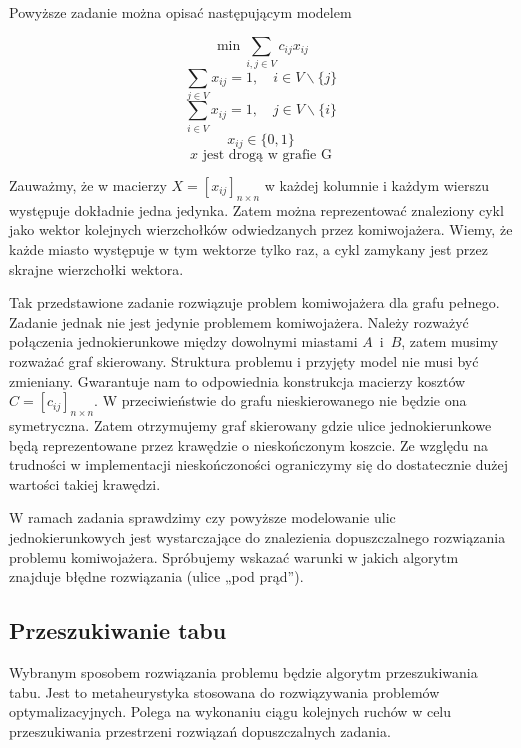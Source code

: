 \documentclass[11pt,a4paper,twoside]{article}
\begin{document}
Powyższe zadanie można opisać następującym modelem

\begin{equation}
\min \sum_{i,j \in V} c_{ij} x_{ij} 
\label{f_celu}
\end{equation}
\begin{equation}
\sum_{j \in V} x_{ij}=1, \quad i \in V \backslash \{j\} 
\end{equation}
\begin{equation}
\sum_{i \in V} x_{ij}=1, \quad j \in V \backslash \{i\} 
\end{equation}
\begin{equation}
x_{ij} \in \{0,1\}
\end{equation}
\begin{equation}
x \text{ jest drogą w grafie G}
\end{equation}


Zauważmy, że w macierzy $X = [x_{ij}]_{n\times n}$ w każdej kolumnie i każdym wierszu występuje dokładnie jedna jedynka. Zatem można reprezentować znaleziony cykl jako wektor kolejnych wierzchołków odwiedzanych przez komiwojażera. Wiemy, że każde miasto występuje w tym wektorze tylko raz, a cykl zamykany jest przez skrajne wierzchołki wektora.

Tak przedstawione zadanie rozwiązuje problem komiwojażera dla grafu pełnego. Zadanie jednak nie jest jedynie problemem komiwojażera. Należy rozważyć połączenia jednokierunkowe między dowolnymi miastami \mbox{$A$ i $B$}, zatem musimy rozważać graf skierowany. Struktura problemu i przyjęty model nie musi być zmieniany. Gwarantuje nam to odpowiednia konstrukcja macierzy kosztów $C = [c_{ij}]_{n\times n}$. W przeciwieństwie do grafu nieskierowanego nie będzie ona symetryczna. Zatem otrzymujemy graf skierowany gdzie ulice jednokierunkowe będą reprezentowane przez krawędzie o nieskończonym koszcie. Ze względu na trudności w implementacji nieskończoności ograniczymy się do dostatecznie dużej wartości takiej krawędzi.

W ramach zadania sprawdzimy czy powyższe modelowanie ulic jednokierunkowych jest wystarczające do znalezienia dopuszczalnego rozwiązania problemu komiwojażera. Spróbujemy wskazać warunki w jakich algorytm znajduje błędne rozwiązania (ulice „pod prąd”).

\subsection{Przeszukiwanie tabu}
Wybranym sposobem rozwiązania problemu będzie algorytm przeszukiwania tabu. Jest to metaheurystyka stosowana do rozwiązywania problemów optymalizacyjnych. Polega na  wykonaniu ciągu kolejnych ruchów w celu przeszukiwania przestrzeni rozwiązań dopuszczalnych zadania. 
\end{document}

